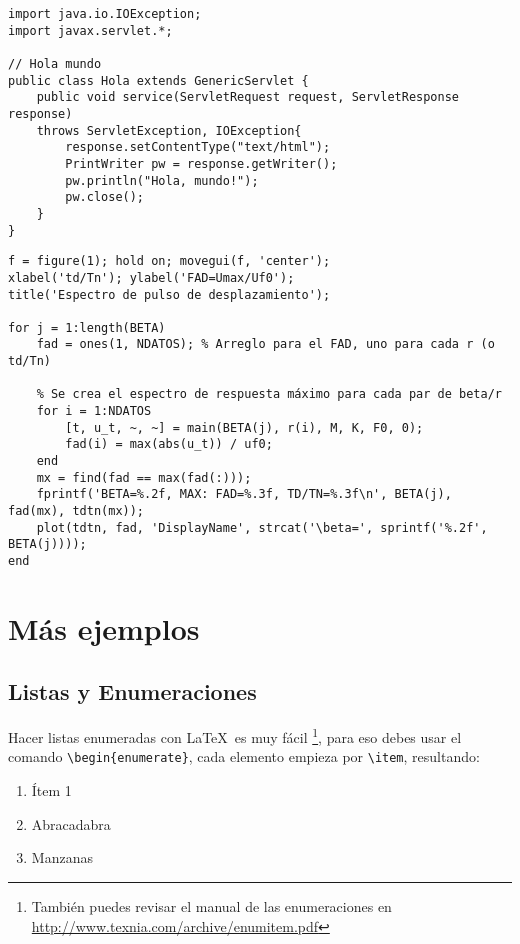 \begin{lstlisting}[style=Java, caption={Ejemplo en Java.\label{codigo-java}}]
import java.io.IOException; 
import javax.servlet.*;

// Hola mundo
public class Hola extends GenericServlet {
	public void service(ServletRequest request, ServletResponse response)
	throws ServletException, IOException{
		response.setContentType("text/html");
		PrintWriter pw = response.getWriter();
		pw.println("Hola, mundo!");
		pw.close();
	}
}
\end{lstlisting}

\begin{lstlisting}[style=Matlab, caption={Ejemplo en Matlab.\label{codigo-matlab}}]
% Se crea gráfico
f = figure(1); hold on; movegui(f, 'center');
xlabel('td/Tn'); ylabel('FAD=Umax/Uf0');
title('Espectro de pulso de desplazamiento');

for j = 1:length(BETA)
	fad = ones(1, NDATOS); % Arreglo para el FAD, uno para cada r (o td/Tn)
	
	% Se crea el espectro de respuesta máximo para cada par de beta/r
	for i = 1:NDATOS
		[t, u_t, ~, ~] = main(BETA(j), r(i), M, K, F0, 0);
		fad(i) = max(abs(u_t)) / uf0;
	end
	mx = find(fad == max(fad(:)));
	fprintf('BETA=%.2f, MAX: FAD=%.3f, TD/TN=%.3f\n', BETA(j), fad(mx), tdtn(mx));
	plot(tdtn, fad, 'DisplayName', strcat('\beta=', sprintf('%.2f', BETA(j))));
end
\end{lstlisting}


\section{Más ejemplos}
	
	\subsection{Listas y Enumeraciones}
		
		Hacer listas enumeradas con \LaTeX\ es muy fácil \footnote{También puedes revisar el manual de las enumeraciones en \url{http://www.texnia.com/archive/enumitem.pdf}}, para eso debes usar el comando \texttt{\textbackslash begin\{enumerate\}}, cada elemento empieza por \texttt{\textbackslash item}, resultando:
		
		\begin{enumerate}
			\item Ítem 1
			\item Abracadabra
			\item Manzanas
		\end{enumerate}
		

